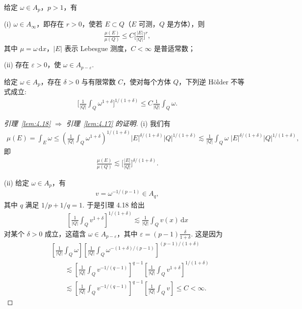 \begin{lemma}\label{lem:4.17}
给定 $\omega \in A_p$，$p > 1$，有

(i) $\omega \in A_{\infty}$，即存在 $r > 0$，使若 $E \subset Q$（$E$ 可测，$Q$ 是方体），则
\begin{align*}
  \frac{\mu(E)}{\mu(Q)}\leq C\Big[\frac{|E|}{|Q|}\Big]^{r},
\end{align*}
其中 $\mu = \omega\,\mathrm{d}x$，$|E|$ 表示 Lebesgue 测度，$C < \infty$ 是普适常数；

(ii) 存在 $\varepsilon > 0$，使 $\omega \in A_{p-\varepsilon}$.
\end{lemma}

\begin{lemma}\label{lem:4.18}
给定 $\omega \in A_p$，存在 $\delta > 0$ 与有限常数 $C$，使对每个方体 $Q$，下列逆 Hölder 不等式成立:
\begin{align*}
  \Big[\frac{1}{|Q|}\int_{Q}\omega^{1+\delta}\Big]^{1/(1+\delta)}
  \leq C\frac{1}{|Q|}\int_{Q}\omega.
\end{align*}
\end{lemma}

\begin{proof}[引理~\ref{lem:4.18} $\Rightarrow$ 引理~\ref{lem:4.17} 的证明]
(i) 我们有
\begin{align*}
  \mu(E)=\int_{E}\omega
  \leq\left(\frac{1}{|Q|}\int_{Q}\omega^{1+\delta}\right)^{1/(1+\delta)}
  |E|^{\delta/(1+\delta)}|Q|^{1/(1+\delta)}
  \lesssim\frac{1}{|Q|}\int_{Q}\omega\;|E|^{\delta/(1+\delta)}|Q|^{1/(1+\delta)},
\end{align*}
即
\begin{align*}
  \frac{\mu(E)}{\mu(Q)}\lesssim\Big[\frac{|E|}{|Q|}\Big]^{\delta/(1+\delta)}.
\end{align*}

(ii) 给定 $\omega \in A_p$，有
\begin{align*}
  v=\omega^{-1/(p-1)}\in A_{q},
\end{align*}
其中 $q$ 满足 $1/p + 1/q = 1$. 于是引理 4.18 给出
\begin{align*}
  \left[\frac{1}{\left|Q\right|}\int_{Q}v^{1+\delta}\right]^{1/(1+\delta)}
  \lesssim\frac{1}{\left|Q\right|}\int_{Q}v(x)\,\mathrm{d}x
\end{align*}
对某个 $\delta > 0$ 成立，这蕴含 $\omega \in A_{p-\varepsilon}$，其中 $\varepsilon = (p-1)\frac{\delta}{1+\delta}$. 这是因为
\begin{align*}
  &\left[\frac{1}{|Q|}\int_{Q}\omega\right]
   \left[\frac{1}{|Q|}\int_{Q}\omega^{-(1+\delta)/(p-1)}\right]^{(p-1)/(1+\delta)}\\
  &\qquad\lesssim\left[\frac{1}{|Q|}\int_{Q}v^{-1/(q-1)}\right]^{q-1}
   \left[\frac{1}{|Q|}\int_{Q}v^{1+\delta}\right]^{1/(1+\delta)}\\
  &\qquad\lesssim\left[\frac{1}{|Q|}\int_{Q}v^{-1/(q-1)}\right]^{q-1}
   \left[\frac{1}{|Q|}\int_{Q}v\right]\leq C<\infty.
\end{align*}
\end{proof}

